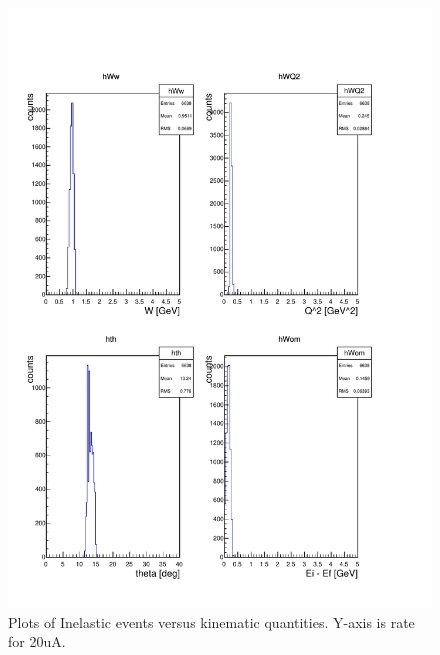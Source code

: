 \documentclass[]{article}
\begin{document}
\begin{figure}	
	\begin{center}
		\includegraphics[width=0.98\columnwidth]{hms_pointtarg_13p5deg_2gev_wc_mscat_vac_sieve_car44_kin.pdf}
	\end{center}
	\caption{Plots of Inelastic events versus kinematic quantities. Y-axis is rate for 20uA. }
	\label{fig:kin}
\end{figure}
\end{document}
